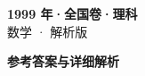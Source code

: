 \documentclass[zihao=-4, a4paper]{ctexart}
\begin{document}
\begin{center}
  {\Large\bfseries 1999 年·全国卷·理科}\\[4pt]
  {\large 数学 · 解析版}
\end{center}
\medskip
{}

\clearpage
{}
\begin{center}{\Large\bfseries 参考答案与详细解析}\end{center}
\medskip

\end{document}
